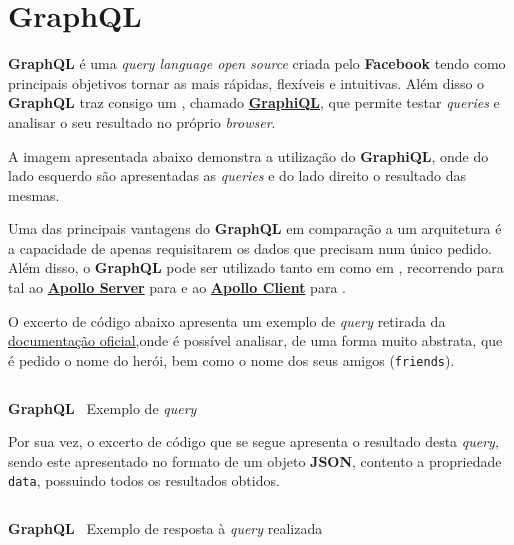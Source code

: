\section{GraphQL}

\begin{minipage}[t]{.3\textwidth}
\end{minipage}
\begin{minipage}[t]{.7\textwidth}
	\minipagerestore
	\textbf{GraphQL} é uma \textit{query language open source} criada pelo \textbf{Facebook} tendo como principais objetivos tornar as  mais rápidas, flexíveis e intuitivas. Além disso o \textbf{GraphQL} traz consigo um , chamado \textbf{\href{https://github.com/graphql/graphiql}{GraphiQL}}, que permite testar \textit{queries} e analisar o seu resultado no próprio \textit{browser}.

	A imagem apresentada abaixo demonstra a utilização do \textbf{GraphiQL}, onde do lado esquerdo são apresentadas as \textit{queries} e do lado direito o resultado das mesmas.
\end{minipage}


Uma das principais vantagens do \textbf{GraphQL} em comparação a um arquitetura  é a capacidade de apenas requisitarem os dados que precisam num único pedido. Além disso, o \textbf{GraphQL} pode ser utilizado tanto em  como em , recorrendo para tal ao \href{https://www.apollographql.com/docs/apollo-server/}{\textbf{Apollo Server}} para  e ao \textbf{\href{https://www.apollographql.com/docs/react/}{Apollo Client}} para .

O excerto de código abaixo apresenta um exemplo de \textit{query} retirada da \href{https://graphql.org/learn/queries/}{documentação oficial},onde é possível analisar, de uma forma muito abstrata, que é pedido o nome do herói, bem como o nome dos seus amigos (\texttt{friends}).

\begin{longlisting}
	\inputminted{text}{code/graphql/example-query.graphql}
	\caption{\textbf{GraphQL} \textemdash~Exemplo de \textit{query}}
\end{longlisting}

Por sua vez, o excerto de código que se segue apresenta o resultado desta \textit{query}, sendo este apresentado no formato de um objeto \textbf{JSON}, contento a propriedade \texttt{data}, possuindo todos os resultados obtidos.

\begin{longlisting}
	\inputminted{json}{code/graphql/example-result.json}
	\caption{\textbf{GraphQL} \textemdash~Exemplo de resposta à \textit{query} realizada}
\end{longlisting}

